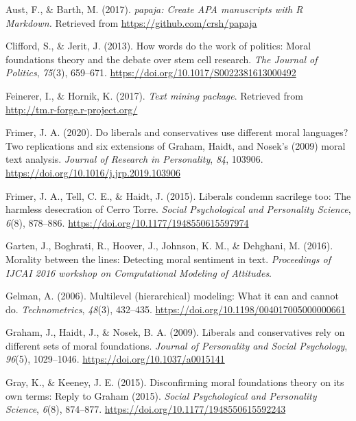 \documentclass[
  man,floatsintext]{apa6}
\newlength{\cslhangindent}
\newlength{\cslentryspacingunit} %
\newenvironment{CSLReferences}[2] %
 {%
  \setlength{\parindent}{0pt}
  \ifodd #1
  \let\oldpar\par
  \def\par{\hangindent=\cslhangindent\oldpar}
  \fi
  \setlength{\parskip}{#2\cslentryspacingunit}
 }%
 {}
\begin{document}
\hypertarget{refs}{}
\begin{CSLReferences}{1}{0}
\leavevmode{}%
Aust, F., \& Barth, M. (2017). \emph{{papaja: Create APA manuscripts with R Markdown.}} Retrieved from \url{https://github.com/crsh/papaja}

\leavevmode{}%
Clifford, S., \& Jerit, J. (2013). How words do the work of politics: Moral foundations theory and the debate over stem cell research. \emph{The Journal of Politics}, \emph{75}(3), 659--671. \url{https://doi.org/10.1017/S0022381613000492}

\leavevmode{}%
Feinerer, I., \& Hornik, K. (2017). \emph{{Text mining package}}. Retrieved from \url{http://tm.r-forge.r-project.org/}

\leavevmode{}%
Frimer, J. A. (2020). Do liberals and conservatives use different moral languages? Two replications and six extensions of {G}raham, {H}aidt, and {N}osek's (2009) moral text analysis. \emph{Journal of Research in Personality}, \emph{84}, 103906. \url{https://doi.org/10.1016/j.jrp.2019.103906}

\leavevmode{}%
Frimer, J. A., Tell, C. E., \& Haidt, J. (2015). Liberals condemn sacrilege too: The harmless desecration of {C}erro {T}orre. \emph{Social Psychological and Personality Science}, \emph{6}(8), 878--886. \url{https://doi.org/10.1177/1948550615597974}

\leavevmode{}%
Garten, J., Boghrati, R., Hoover, J., Johnson, K. M., \& Dehghani, M. (2016). Morality between the lines: Detecting moral sentiment in text. \emph{{Proceedings of IJCAI 2016 workshop on Computational Modeling of Attitudes}}.

\leavevmode{}%
Gelman, A. (2006). {Multilevel (hierarchical) modeling: What it can and cannot do}. \emph{Technometrics}, \emph{48}(3), 432--435. \url{https://doi.org/10.1198/004017005000000661}

\leavevmode{}%
Graham, J., Haidt, J., \& Nosek, B. A. (2009). {Liberals and conservatives rely on different sets of moral foundations.} \emph{Journal of Personality and Social Psychology}, \emph{96}(5), 1029--1046. \url{https://doi.org/10.1037/a0015141}

\leavevmode{}%
Gray, K., \& Keeney, J. E. (2015). Disconfirming moral foundations theory on its own terms: Reply to {G}raham (2015). \emph{Social Psychological and Personality Science}, \emph{6}(8), 874--877. \url{https://doi.org/10.1177/1948550615592243}


\end{CSLReferences}
\end{document}
